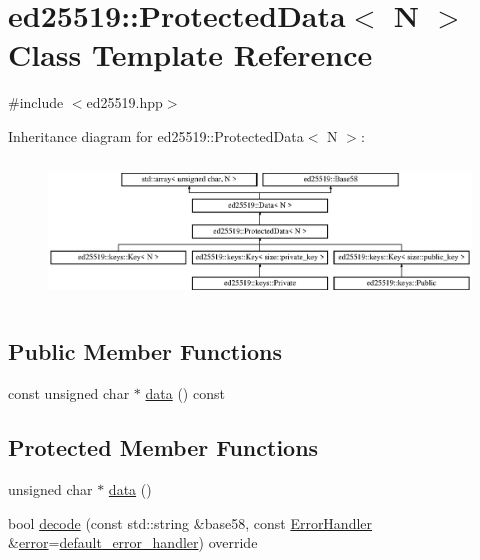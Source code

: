 \hypertarget{classed25519_1_1_protected_data}{}\section{ed25519\+::Protected\+Data$<$ N $>$ Class Template Reference}
\label{classed25519_1_1_protected_data}


{\ttfamily \#include $<$ed25519.\+hpp$>$}

Inheritance diagram for ed25519\+::Protected\+Data$<$ N $>$\+:\begin{figure}[H]
\begin{center}
\leavevmode
\includegraphics[height=3.778677cm]{classed25519_1_1_protected_data}
\end{center}
\end{figure}
\subsection*{Public Member Functions}
\begin{DoxyCompactItemize}
\item 
const unsigned char $\ast$ \mbox{\hyperlink{classed25519_1_1_protected_data_a4b550b14851e4553fff55e04bf052adf}{data}} () const
\end{DoxyCompactItemize}
\subsection*{Protected Member Functions}
\begin{DoxyCompactItemize}
\item 
unsigned char $\ast$ \mbox{\hyperlink{classed25519_1_1_protected_data_a4d95663d6cd6b4ec30c6d0969ca896e9}{data}} ()
\item 
bool \mbox{\hyperlink{classed25519_1_1_protected_data_a708852546126e7d19229e247b92a98f6}{decode}} (const std\+::string \&base58, const \mbox{\hyperlink{namespaceed25519_a6ba572942b3c18591fc869d52a6b16e6}{Error\+Handler}} \&\mbox{\hyperlink{namespaceed25519_ac93d0b5156eaca22197055e902920bc4}{error}}=\mbox{\hyperlink{namespaceed25519_a7c7bb6ed17541162959c33ed3e3b15fb}{default\+\_\+error\+\_\+handler}}) override
\end{DoxyCompactItemize}
